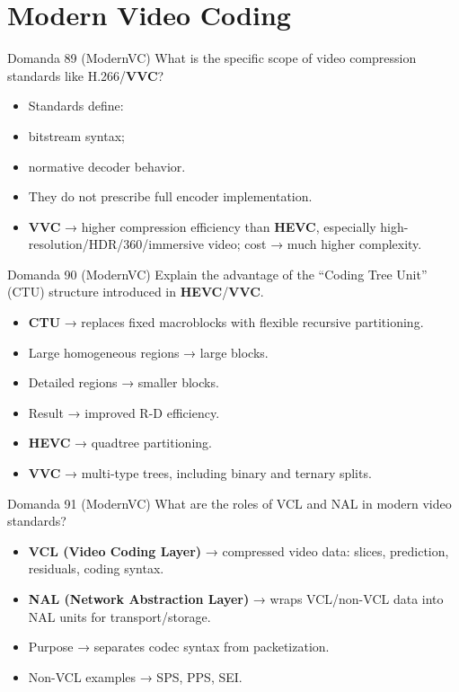 \section{Modern Video Coding}




\begin{questionbox}{Domanda 89}
(ModernVC) What is the specific scope of video compression standards like H.266/\textbf{VVC}?
\end{questionbox}


\begin{itemize}
  \item Standards define:
  \item bitstream syntax;
  \item normative decoder behavior.
  \item They do not prescribe full encoder implementation.
  \item \textbf{VVC} → higher compression efficiency than \textbf{HEVC}, especially high-resolution/HDR/360/immersive video; cost → much higher complexity.
\end{itemize}



\begin{questionbox}{Domanda 90}
(ModernVC) Explain the advantage of the “Coding Tree Unit” (CTU) structure introduced in \textbf{HEVC}/\textbf{VVC}.
\end{questionbox}


\begin{itemize}
  \item \textbf{CTU} → replaces fixed macroblocks with flexible recursive partitioning.
  \item Large homogeneous regions → large blocks.
  \item Detailed regions → smaller blocks.
  \item Result → improved R-D efficiency.
  \item \textbf{HEVC} → quadtree partitioning.
  \item \textbf{VVC} → multi-type trees, including binary and ternary splits.
\end{itemize}



\begin{questionbox}{Domanda 91}
(ModernVC) What are the roles of VCL and NAL in modern video standards?
\end{questionbox}


\begin{itemize}
  \item \textbf{VCL (Video Coding Layer)} → compressed video data: slices, prediction, residuals, coding syntax.
  \item \textbf{NAL (Network Abstraction Layer)} → wraps VCL/non-VCL data into NAL units for transport/storage.
  \item Purpose → separates codec syntax from packetization.
  \item Non-VCL examples → SPS, PPS, SEI.
\end{itemize}



